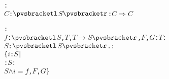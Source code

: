 \begin{alltt}
  : 
    \pvsid{(} \pvsid{(}\(C\): \({\pvsbracketl}\)\(S\)\({\pvsbracketr}\)\pvsid{)}: \pvsid{(}\(C\)\pvsid{)} \(\Rightarrow\) \pvsid{(}\(C\)\pvsid{)}\pvsid{)}\vspace*{\pvsdeclspacing}

  : 
     \pvsid{(}\(f\): \({\pvsbracketl}\)\(S\), \(T\), \(T\) \(\rightarrow\) \(S\)\({\pvsbracketr}\), \(F\), \(G\): \(T\)\pvsid{)}:
       \pvsid{(}\(S\): \({\pvsbracketl}\)\(S\)\({\pvsbracketr}\).\pvsid{)}:
        \pvsid{(}\{\(i\): \(S\) |
                        \pvsid{(}: \(S\)\pvsid{)}:
                         \(S\)\pvsid{(}\pvsid{)} \(\wedge\) \(i\) \(=\) \(f\)\pvsid{(}, \(F\), \(G\)\pvsid{)}\}\pvsid{)}\vspace*{\pvsdeclspacing}

  \end{alltt}
